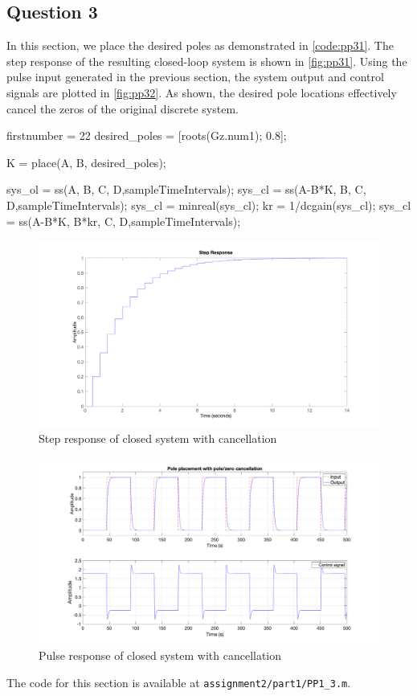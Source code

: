 \FloatBarrier
\subsection{Question 3}
In this section, we place the desired poles as demonstrated in \autoref{code:pp31}. The step response of the resulting closed-loop system is shown in \autoref{fig:pp31}. Using the pulse input generated in the previous section, the system output and control signals are plotted in \autoref{fig:pp32}. As shown, the desired pole locations effectively cancel the zeros of the original discrete system.

\begin{code}
	\begin{matlabcode}{firstnumber = 22}
	desired_poles = [roots(Gz.num{1}); 0.8];  %
	
	K = place(A, B, desired_poles);
	
	sys_ol = ss(A, B, C, D,sampleTimeIntervals);
	sys_cl = ss(A-B*K, B, C, D,sampleTimeIntervals);
	sys_cl = minreal(sys_cl);
	kr = 1/dcgain(sys_cl);
	sys_cl = ss(A-B*K, B*kr, C, D,sampleTimeIntervals);
	\end{matlabcode}
	\label{code:pp31}
\end{code}

\begin{figure}
	\centering
	\includegraphics[width=\textwidth]{images/pp31.png}
	\caption{Step response of closed system with cancellation}
	\label{fig:pp31}
\end{figure}

\begin{figure}
	\centering
	\includegraphics[width=\textwidth]{images/pp32.png}
	\caption{Pulse response of closed system with cancellation}
	\label{fig:pp32}
\end{figure}

\noindent The code for this section is available at \lstinline|assignment2/part1/PP1_3.m|. 
